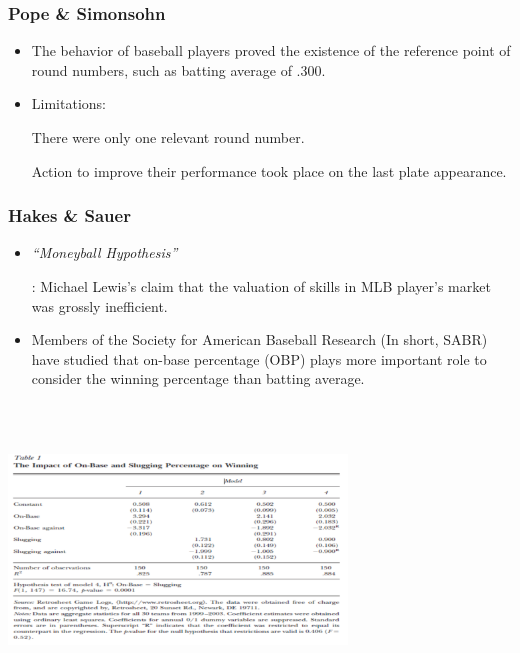 \documentclass[dvipdfmx,12pt]{beamer}
\begin{document}
\begin{frame}\frametitle{Pope \& Simonsohn}

 \begin{itemize}
 
 \item The behavior of baseball players proved the existence of the reference point of round numbers, such as batting average of .300.
 
 \item Limitations:
 
 There were only one relevant round number.
 
 Action to improve their performance took place on the last plate appearance.
 
 \end{itemize}

\end{frame}

\begin{frame}\frametitle{Hakes \& Sauer}

 \begin{itemize}
 \item \textit{``Moneyball Hypothesis''}
 
 : Michael Lewis's claim that the valuation of skills in MLB player's market was grossly inefficient.
 
 \item Members of the Society for American Baseball Research (In short, SABR) have studied that
 on-base percentage (OBP) plays more important role to consider the winning percentage than batting average.
 
 \end{itemize}

\end{frame}

\begin{frame}

\begin{center}

\includegraphics[width=9cm,height=7.75cm]{Hakes_Sauer_T1.pdf}

\end{center}

\end{frame}
\end{document}
